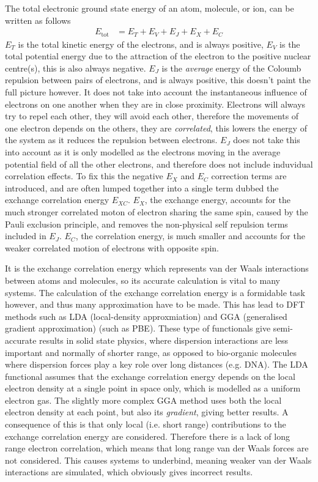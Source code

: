 \documentclass[10pt,a4paper,twocolumn,twoside]{extarticle}
\begin{document}
	The total electronic ground state energy of an atom, molecule, or ion, can be written as follows
	\begin{align}
		E_\text{tot} &= E_T + E_V + E_J + E_X + E_C
	\end{align}
	$E_T$ is the total kinetic energy of the electrons, and is always positive, $E_V$ is the total potential energy due to the attraction of the electron to the positive nuclear centre(s), this is also always negative. $E_J$ is the \emph{average} energy of the Coloumb repulsion between pairs of electrons, and is always positive, this doesn't paint the full picture however. 
	It does not take into account the instantaneous influence of electrons on one another when they are in close proximity. Electrons will always try to repel each other, they will avoid each other, therefore the movements of one electron depends on the others, they are \emph{correlated}, this lowers the energy of the system as it reduces the repulsion between electrons. $E_J$ does not take this into account as it is only modelled as the electrons moving in the average potential field of all the other electrons, and therefore does not include induvidual correlation effects. 
	To fix this the negative $E_X$ and $E_C$ correction terms are introduced, and are often lumped together into a single term dubbed the exchange correlation energy $E_{XC}$. 
	$E_X$, the exchange energy, accounts for the much stronger correlated moton of electron sharing the same spin, caused by the Pauli exclusion principle, and removes the non-physical self repulsion terms included in $E_J$. $E_C$, the correlation energy, is much smaller and accounts for the weaker correlated motion of electrons with opposite spin. 

	It is the exchange correlation energy which represents van der Waals interactions between atoms and molecules, so its accurate calculation is vital to many systems.
	The calculation of the exchange correlation energy is a formidable task however, and thus many approximation have to be made. This has lead to DFT methods such as LDA (local-density approxmiation) and GGA (generalised gradient approximation) (such as PBE). 
	These type of functionals give semi-accurate results in solid state physics, where dispersion interactions are less important and normally of shorter range, as opposed to bio-organic molecules where dispersion forces play a key role over long distances (e.g. DNA).\cite{vdWImportance-Kaplan2006} The LDA functional assumes that the exchange correlation energy depends on the local electron density at a single point in space only, which is modelled as a uniform electron gas.\cite{LDA-Kohn1965} The slightly more complex GGA method uses both the local electron density at each point, but also its \emph{gradient}, giving better results.\cite{GGA-Becke1988}\cite{GGA-Perdew1986} A consequence of this is that only local (i.e. short range) contributions to the exchange correlation energy are considered. Therefore there is a lack of long range electron correlation, which means that long range van der Waals forces are not considered. This causes systems to underbind, meaning weaker van der Waals interactions are simulated, which obviously gives incorrect results. 
\end{document}

